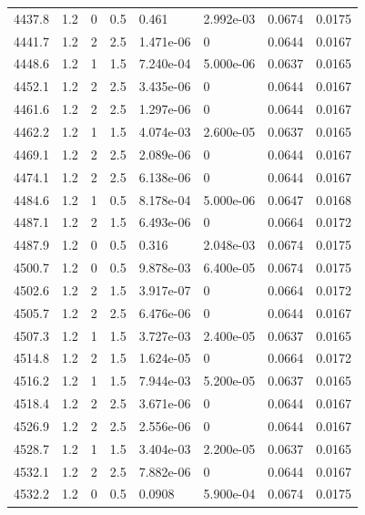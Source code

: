 \documentclass[preview]{standalone}
\begin{document}
{{{{{{{{{{{{{{{{{\begin{tabular}{L{1.2cm}C{1.2cm} C{0.3cm}C{0.5cm} C{1.4cm}C{1.4cm} C{1.4cm}C{1.4cm}}
  4437.8  &   1.2  & 0     & 0.5 &  0.461  & 2.992e-03  & 0.0674 &  0.0175   \\ 
  4441.7  &   1.2  & 2     & 2.5 &  1.471e-06  & 0  & 0.0644 &  0.0167   \\ 
  4448.6  &   1.2  & 1     & 1.5 &  7.240e-04  & 5.000e-06  & 0.0637 &  0.0165   \\ 
  4452.1  &   1.2  & 2     & 2.5 &  3.435e-06  & 0  & 0.0644 &  0.0167   \\ 
  4461.6  &   1.2  & 2     & 2.5 &  1.297e-06  & 0  & 0.0644 &  0.0167   \\ 
  4462.2  &   1.2  & 1     & 1.5 &  4.074e-03  & 2.600e-05  & 0.0637 &  0.0165   \\ 
  4469.1  &   1.2  & 2     & 2.5 &  2.089e-06  & 0  & 0.0644 &  0.0167   \\ 
  4474.1  &   1.2  & 2     & 2.5 &  6.138e-06  & 0  & 0.0644 &  0.0167   \\ 
  4484.6  &   1.2  & 1     & 0.5 &  8.178e-04  & 5.000e-06  & 0.0647 &  0.0168   \\ 
  4487.1  &   1.2  & 2     & 1.5 &  6.493e-06  & 0  & 0.0664 &  0.0172   \\ 
  4487.9  &   1.2  & 0     & 0.5 &  0.316  & 2.048e-03  & 0.0674 &  0.0175   \\ 
  4500.7  &   1.2  & 0     & 0.5 &  9.878e-03  & 6.400e-05  & 0.0674 &  0.0175   \\ 
  4502.6  &   1.2  & 2     & 1.5 &  3.917e-07  & 0  & 0.0664 &  0.0172   \\ 
  4505.7  &   1.2  & 2     & 2.5 &  6.476e-06  & 0  & 0.0644 &  0.0167   \\ 
  4507.3  &   1.2  & 1     & 1.5 &  3.727e-03  & 2.400e-05  & 0.0637 &  0.0165   \\ 
  4514.8  &   1.2  & 2     & 1.5 &  1.624e-05  & 0  & 0.0664 &  0.0172   \\ 
  4516.2  &   1.2  & 1     & 1.5 &  7.944e-03  & 5.200e-05  & 0.0637 &  0.0165   \\ 
  4518.4  &   1.2  & 2     & 2.5 &  3.671e-06  & 0  & 0.0644 &  0.0167   \\ 
  4526.9  &   1.2  & 2     & 2.5 &  2.556e-06  & 0  & 0.0644 &  0.0167   \\ 
  4528.7  &   1.2  & 1     & 1.5 &  3.404e-03  & 2.200e-05  & 0.0637 &  0.0165   \\ 
  4532.1  &   1.2  & 2     & 2.5 &  7.882e-06  & 0  & 0.0644 &  0.0167   \\ 
  4532.2  &   1.2  & 0     & 0.5 &  0.0908  & 5.900e-04  & 0.0674 &  0.0175   \\ 

\end{tabular}}}}}}}}}}}}}}}}}}
\end{document}
